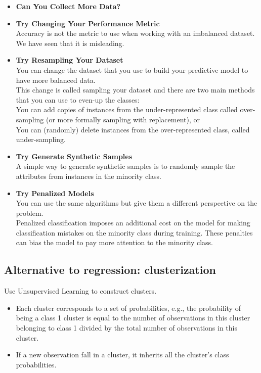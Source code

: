 \begin{itemize}
    \item \textbf{Can You Collect More Data?}
    \item \textbf{Try Changing Your Performance Metric}\\
    Accuracy is not the metric to use when working with an imbalanced dataset. We have seen that it is misleading.
    \item \textbf{Try Resampling Your Dataset}\\
    You can change the dataset that you use to build your predictive model to have more balanced data.\\
    This change is called sampling your dataset and there are two main methods that you can use to even-up the classes:\\
    You can add copies of instances from the under-represented class called over-sampling (or more formally sampling with replacement), or\\
    You can (randomly) delete instances from the over-represented class, called under-sampling.
    \item \textbf{Try Generate Synthetic Samples}\\
    A simple way to generate synthetic samples is to randomly sample the attributes from instances in the minority class.
    \item \textbf{Try Penalized Models}\\
    You can use the same algorithms but give them a different perspective on the problem.\\
    Penalized classification imposes an additional cost on the model for making classification mistakes on the minority class during training. These penalties can bias the model to pay more attention to the minority class.
\end{itemize}

\subsection{Alternative to regression: clusterization}

Use Unsupervised Learning to construct clusters.
\begin{itemize}
    \item Each cluster corresponds to a set of probabilities, e.g., the probability of being a class 1 cluster is equal to the number of observations in this cluster belonging to class 1 divided by the total number of observations in this cluster.
    \item If a new observation fall in a cluster, it inherits all the cluster's class probabilities.
\end{itemize}

